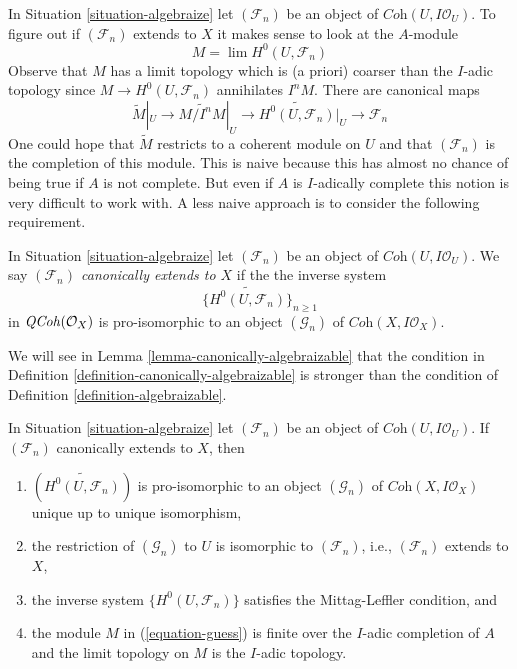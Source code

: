 \noindent
In Situation \ref{situation-algebraize} let $(\mathcal{F}_n)$ be an
object of $\textit{Coh}(U, I\mathcal{O}_U)$. To figure out if
$(\mathcal{F}_n)$ extends to $X$ it makes sense to look at the $A$-module
\begin{equation}
\label{equation-guess}
M = \lim H^0(U, \mathcal{F}_n)
\end{equation}
Observe that $M$ has a limit topology which is (a priori) coarser than
the $I$-adic topology since $M \to H^0(U, \mathcal{F}_n)$ annihilates $I^nM$.
There are canonical maps
$$
\widetilde{M}|_U \to \widetilde{M/I^nM}|_U \to
\widetilde{H^0(U, \mathcal{F}_n)}|_U \to
\mathcal{F}_n
$$
One could hope that $\widetilde{M}$ restricts to a coherent module
on $U$ and that $(\mathcal{F}_n)$ is the completion of this module.
This is naive because this has almost no chance of being true
if $A$ is not complete. But even if $A$ is $I$-adically complete
this notion is very difficult to work with.
A less naive approach is to consider the following requirement.

\begin{definition}
\label{definition-canonically-algebraizable}
In Situation \ref{situation-algebraize} let $(\mathcal{F}_n)$ be an
object of $\textit{Coh}(U, I\mathcal{O}_U)$. We say
{\it $(\mathcal{F}_n)$ canonically extends to $X$} if the the
inverse system
$$
\{\widetilde{H^0(U, \mathcal{F}_n)}\}_{n \geq 1}
$$
in $\mathit{QCoh}(\mathcal{O}_X)$ is pro-isomorphic to an object
$(\mathcal{G}_n)$ of $\textit{Coh}(X, I\mathcal{O}_X)$.
\end{definition}

\noindent
We will see in Lemma \ref{lemma-canonically-algebraizable}
that the condition in Definition \ref{definition-canonically-algebraizable}
is stronger than the condition of Definition \ref{definition-algebraizable}.

\begin{lemma}
\label{lemma-canonically-algebraizable}
In Situation \ref{situation-algebraize} let $(\mathcal{F}_n)$ be an
object of $\textit{Coh}(U, I\mathcal{O}_U)$. If $(\mathcal{F}_n)$
canonically extends to $X$, then
\begin{enumerate}
\item $(\widetilde{H^0(U, \mathcal{F}_n)})$ is pro-isomorphic to an
object $(\mathcal{G}_n)$ of $\textit{Coh}(X, I \mathcal{O}_X)$
unique up to unique isomorphism,
\item the restriction of $(\mathcal{G}_n)$ to $U$ is isomorphic
to $(\mathcal{F}_n)$, i.e., $(\mathcal{F}_n)$ extends to $X$,
\item the inverse system $\{H^0(U, \mathcal{F}_n)\}$
satisfies the Mittag-Leffler condition, and
\item the module $M$ in (\ref{equation-guess}) is finite over the
$I$-adic completion of $A$ and the limit topology on
$M$ is the $I$-adic topology.
\end{enumerate}
\end{lemma}

